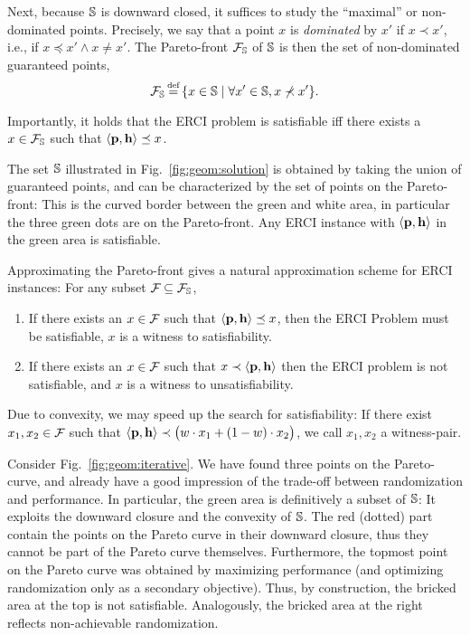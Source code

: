 Next, because $\mathbb{S}$ is downward closed, it
suffices to study the ``maximal'' or non-dominated points.  Precisely,
we say that a point $x$ is \emph{dominated} by $x'$ if $x \prec
x'$, i.e., if $x \preceq x' \wedge x \neq x'$.
The Pareto-front $\mathcal{F}_{\mathbb{S}}$ of $\mathbb{S}$ is then the set of non-dominated guaranteed points,
\begin{equation}
  \pareto{\solutions} \eqdef \{ x \in \solutions \mid \forall x' \in \solutions, x \not\prec x'  \}.  
\end{equation}
\noindent
\begin{mdframed}
Importantly, it holds that the ERCI problem is satisfiable iff there exists a  $x \in \mathcal{F}_{\mathbb{S}}$ such that $\langle \mathbf{p}, \mathbf{h} \rangle \preceq x$.    
\end{mdframed}
\begin{example}
	The set $\mathbb{S}$ illustrated in Fig.~\ref{fig:geom:solution} is obtained by taking the union of guaranteed points, and can be characterized by the set of points on the Pareto-front: This is the curved border between the green and white area, in particular the three green dots are on the Pareto-front. Any ERCI instance with $\langle \mathbf{p}, \mathbf{h} \rangle$ in the green area is satisfiable.
\end{example}


\noindent
Approximating the Pareto-front gives a natural approximation
scheme for ERCI instances: For any subset $\mathcal{F}_{} \subseteq
\mathcal{F}_{\mathbb{S}}$,
\begin{enumerate}
\item If there exists an $x \in \mathcal{F}_{}$ such that
$\langle \mathbf{p}, \mathbf{h} \rangle \preceq x$, then the ERCI
Problem must be satisfiable, $x$ is a witness to satisfiability.
\item If there exists an $x \in \mathcal{F}_{}$
such that $x \prec \langle \mathbf{p}, \mathbf{h} \rangle$ then the
ERCI problem is not satisfiable, and $x$ is a witness to unsatisfiability.
\end{enumerate}
Due to convexity, we may speed up the search for satisfiability: If there exist $x_1, x_2 \in \mathcal{F}_{}$ such that $\langle \mathbf{p}, \mathbf{h} \rangle \prec \big(w \cdot x_1 + (1-w) \cdot x_2\big)$, we call $x_1,x_2$ a witness-pair.

\begin{example}
\label{ex:approximation}
	Consider Fig.~\ref{fig:geom:iterative}. We have found three points on the Pareto-curve, and already have a good impression of the trade-off between randomization and performance. In particular, the green area is definitively a subset of $\mathbb{S}$: It exploits the downward closure and the convexity of $\mathbb{S}$. The red (dotted) part contain the points on the Pareto curve in their downward closure, thus they cannot be part of the Pareto curve themselves.
	Furthermore, the topmost point on the Pareto curve was obtained by maximizing performance (and optimizing randomization only as a secondary objective). Thus, by construction, the bricked area at the top is not satisfiable. Analogously, the bricked area at the right reflects non-achievable randomization. 
\end{example}

